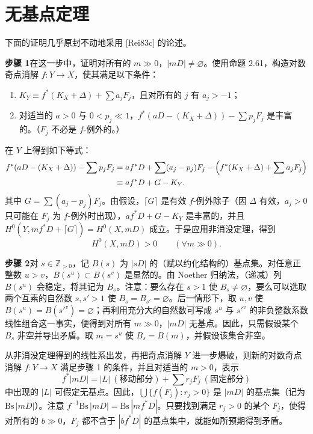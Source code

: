 \section{无基点定理}

下面的证明几乎原封不动地采用 [Rei83c] 的论述。

\par\medskip\noindent\textbf{步骤 1}\quad 在这一步中，证明对所有的 $m\gg 0$，$|mD|\neq\varnothing$。使用命题 2.61，构造对数奇点消解 $f:Y\to X$，使其满足以下条件：
\begin{enumerate}[label=(\arabic*),leftmargin=2.4em,itemsep=1pt,topsep=2pt,parsep=0pt]
\item $K_Y\equiv f^*(K_X+\Delta)+\sum a_jF_j$，且对所有的 $j$ 有 $a_j>-1$；
\item 对适当的 $a>0$ 与 $0<p_j\ll 1$，$f^*(aD-(K_X+\Delta))-\sum p_jF_j$ 是丰富的。（$F_j$ 不必是 $f$-例外的。）
\end{enumerate}
在 $Y$ 上得到如下等式：
\begin{align*}
f^*(aD-(K_X+\Delta))-\sum p_jF_j
&=af^*D+\sum(a_j-p_j)F_j-\Bigl(f^*(K_X+\Delta)+\sum a_jF_j\Bigr)\\
&\equiv af^*D+G-K_Y.
\end{align*}
其中 $G=\sum(a_j-p_j)F_j$。由假设，$\lceil G\rceil$ 是有效 $f$-例外除子（因 $\Delta$ 有效，$a_j>0$ 只可能在 $F_j$ 为 $f$-例外时出现），$af^*D+G-K_Y$ 是丰富的，并且 $H^0(Y,mf^*D+\lceil G\rceil)=H^0(X,mD)$ 成立。于是应用非消没定理，得到
\[
H^0(X,mD)>0\qquad(\forall m\gg 0).
\]

\par\medskip\noindent\textbf{步骤 2}\quad 对 $s\in\mathbb{Z}_{>0}$，记 $B(s)$ 为 $|sD|$ 的（赋以约化结构的）基点集。对任意正整数 $u>v$，$B(s^u)\subset B(s^v)$ 是显然的。由 Noether 归纳法，（递减）列 $B(s^u)$ 会稳定，将其记为 $B_s$。注意：要么存在 $s>1$ 使 $B_s\neq\varnothing$，要么可以选取两个互素的自然数 $s,s'>1$ 使 $B_s=B_{s'}=\varnothing$。后一情形下，取 $u,v$ 使 $B(s^u)=B(s'^v)=\varnothing$；再利用充分大的自然数可写成 $s^u$ 与 $s'^v$ 的非负整数系数线性组合这一事实，便得到对所有 $m\gg 0$，$|mD|$ 无基点。因此，只需假设某个 $B_s$ 非空并导出矛盾。取 $m=s^u$ 使 $B_s=B(m)$，并假设该集合非空。

从非消没定理得到的线性系出发，再把奇点消解 $Y$ 进一步爆破，则新的对数奇点消解 $f:Y\to X$ 满足步骤 1 的条件，并且对适当的 $m>0$，表示
\[
f^*|mD|=|L|\ (\text{移动部分})+\sum r_jF_j\ (\text{固定部分})
\]
中出现的 $|L|$ 可假定无基点。因此，$\bigcup\{f(F_j):r_j>0\}$ 是 $|mD|$ 的基点集（记为 $\mathrm{Bs}\,|mD|$）。注意 $f^{-1}\mathrm{Bs}\,|mD|=\mathrm{Bs}\,|mf^*D|$。只要找到满足 $r_j>0$ 的某个 $F_j$，使得对所有的 $b\gg 0$，$F_j$ 都不含于 $|bf^*D|$ 的基点集中，就能如所预期得到矛盾。

